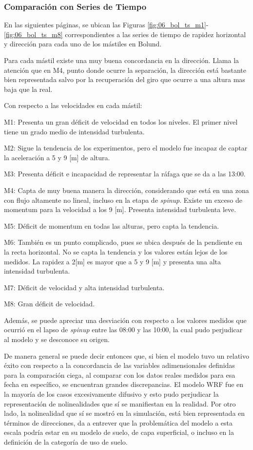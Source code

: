 \subsubsection{Comparación con Series de Tiempo}
En las siguientes páginas, se ubican las Figuras \ref{fig:06_bol_ts_m1}-\ref{fig:06_bol_ts_m8} correspondientes a las series de tiempo de rapidez horizontal y dirección para cada uno de los mástiles en Bolund. 

Para cada mástil existe una muy buena concordancia en la dirección. Llama la atención que en M4, punto donde ocurre la separación, la dirección está bastante bien representada salvo por la recuperación del giro que ocurre a una altura mas baja que la real. 

Con respecto a las velocidades en cada mástil:
\begin{itemize*}
	\item M1: Presenta un gran déficit de velocidad en todos los niveles. El primer nivel tiene un grado medio de intensidad turbulenta.
	\item M2: Sigue la tendencia de los experimentos, pero el modelo fue incapaz de captar la aceleración a 5 y 9 [m] de altura.
	\item M3: Presenta déficit e incapacidad de representar la ráfaga que se da a las 13:00.
	\item M4: Capta de muy buena manera la dirección, considerando que está en una zona con flujo altamente no lineal, incluso en la etapa de \emph{spinup}. Existe un exceso de momentum para la velocidad a los 9 [m]. Presenta intensidad turbulenta leve.
	\item M5: Déficit de momentum en todas las alturas, pero capta la tendencia.
	\item M6: También es un punto complicado, pues se ubica después de la pendiente en la recta horizontal. No se capta la tendencia y los valores están lejos de los medidos. La rapidez a 2[m] es mayor que a 5 y 9 [m] y presenta una alta intensidad turbulenta.
	\item M7: Déficit de velocidad y alta intensidad turbulenta.
	\item M8: Gran déficit de velocidad.
\end{itemize*} 

Además, se puede apreciar una desviación con respecto a los valores medidos que ocurrió en el lapso de \emph{spinup} entre las 08:00 y las 10:00, la cual pudo perjudicar al modelo y se desconoce su origen.

De manera general se puede decir entonces que, si bien el modelo tuvo un relativo éxito con respecto a la concordancia de las variables adimensionales definidas para la comparación ciega, al comparar con los datos reales medidos para esa fecha en específico, se encuentran grandes discrepancias. El modelo WRF fue en la mayoría de los casos excesivamente difusivo y esto pudo perjudicar la representación de nolinealidades que sí se manifiestan en la realidad. Por otro lado, la nolinealidad que sí se mostró en la simulación, está bien representada en términos de direcciones, da a entrever que la problemática del modelo a esta escala podría estar en su modelo de suelo, de capa superficial, o incluso en la definición de la categoría de uso de suelo.

